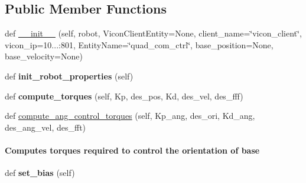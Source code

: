 \subsection*{Public Member Functions}
\begin{DoxyCompactItemize}
\item 
def \hyperlink{classpython_1_1dg__tools_1_1leg__impedance__control_1_1quad__leg__impedance__controller_1_1QuadrupedComControl_a79f0bfd4d6bec7c6db16a92dfcbae34d}{\+\_\+\+\_\+init\+\_\+\+\_\+} (self, robot, Vicon\+Client\+Entity=None, client\+\_\+name=\char`\"{}vicon\+\_\+client\char`\"{}, vicon\+\_\+ip=\textquotesingle{}10...\+:801\textquotesingle{}, Entity\+Name=\char`\"{}quad\+\_\+com\+\_\+ctrl\char`\"{}, base\+\_\+position=None, base\+\_\+velocity=None)
\item 
def {\bfseries init\+\_\+robot\+\_\+properties} (self)\hypertarget{classpython_1_1dg__tools_1_1leg__impedance__control_1_1quad__leg__impedance__controller_1_1QuadrupedComControl_a24959d27c6da979857fa30013833441b}{}\label{classpython_1_1dg__tools_1_1leg__impedance__control_1_1quad__leg__impedance__controller_1_1QuadrupedComControl_a24959d27c6da979857fa30013833441b}

\item 
def {\bfseries compute\+\_\+torques} (self, Kp, des\+\_\+pos, Kd, des\+\_\+vel, des\+\_\+fff)\hypertarget{classpython_1_1dg__tools_1_1leg__impedance__control_1_1quad__leg__impedance__controller_1_1QuadrupedComControl_a7d000c801d5acd59cc68d91e58b3b1d3}{}\label{classpython_1_1dg__tools_1_1leg__impedance__control_1_1quad__leg__impedance__controller_1_1QuadrupedComControl_a7d000c801d5acd59cc68d91e58b3b1d3}

\item 
def \hyperlink{classpython_1_1dg__tools_1_1leg__impedance__control_1_1quad__leg__impedance__controller_1_1QuadrupedComControl_abb466e86a2c54b0c3d0aebe6142dbc4b}{compute\+\_\+ang\+\_\+control\+\_\+torques} (self, Kp\+\_\+ang, des\+\_\+ori, Kd\+\_\+ang, des\+\_\+ang\+\_\+vel, des\+\_\+fft)\hypertarget{classpython_1_1dg__tools_1_1leg__impedance__control_1_1quad__leg__impedance__controller_1_1QuadrupedComControl_abb466e86a2c54b0c3d0aebe6142dbc4b}{}\label{classpython_1_1dg__tools_1_1leg__impedance__control_1_1quad__leg__impedance__controller_1_1QuadrupedComControl_abb466e86a2c54b0c3d0aebe6142dbc4b}

\begin{DoxyCompactList}\small\item\em \paragraph*{Computes torques required to control the orientation of base}\end{DoxyCompactList}\item 
def {\bfseries set\+\_\+bias} (self)\hypertarget{classpython_1_1dg__tools_1_1leg__impedance__control_1_1quad__leg__impedance__controller_1_1QuadrupedComControl_aeba77303f6d204751b7b2d376fa44531}{}\label{classpython_1_1dg__tools_1_1leg__impedance__control_1_1quad__leg__impedance__controller_1_1QuadrupedComControl_aeba77303f6d204751b7b2d376fa44531}


\end{DoxyCompactItemize}
